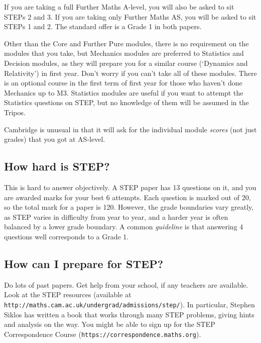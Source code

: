 \documentclass[a4paper]{article}
\begin{document}
If you are taking a full Further Maths A-level, you will also be asked to sit
STEPs 2 and 3. If you are taking only Further Maths AS, you will be asked to sit
STEPs 1 and 2. The standard offer is a Grade 1 in both papers. 

Other than the Core and Further Pure modules, there is no requirement on the
modules that you take, but Mechanics modules are preferred to Statistics and
Decision modules, as they will prepare you for a similar course (`Dynamics and
Relativity') in first year. Don't worry if you can't take all of these modules.
There is an optional course in the first term of first year for those who
haven't done Mechanics up to M3. Statistics modules are useful if you want to
attempt the Statistics questions on STEP, but no knowledge of them will be
assumed in the Tripos.

Cambridge is unusual in that it will ask for the individual module
\textit{scores} (not just grades) that you got at AS-level. 

\subsection{How hard is STEP?}

This is hard to answer objectively. A STEP paper has 13 questions on it, and you
are awarded marks for your best 6 attempts. Each question is marked out of 20,
so the total mark for a paper is 120. However, the grade boundaries vary
greatly, as STEP varies in difficulty from year to year, and a harder year is
often balanced by a lower grade boundary. A common \textit{guideline} is that
answering 4 questions well corresponds to a Grade 1.

\subsection{How can I prepare for STEP?}

Do lots of past papers. Get help from your school, if any teachers are
available. Look at the STEP resources
(available at \texttt{http://maths.cam.ac.uk/undergrad/admissions/step/}). In
particular, Stephen Siklos has written a book that works through many STEP
problems, giving hints and analysis on the way.  You might be able to sign up
for the STEP Correspondence Course (\texttt{https://correspondence.maths.org}).
\end{document}
